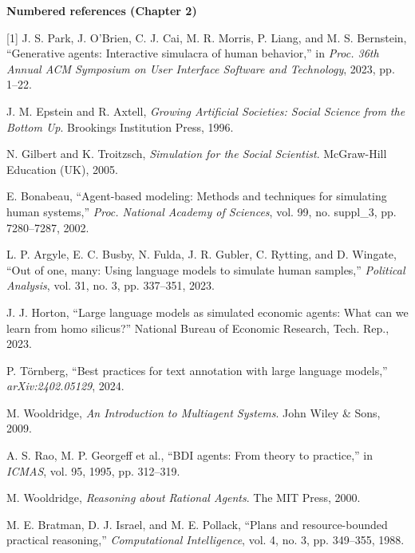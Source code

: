 
{\footnotesize\setlength{\parindent}{0pt}

\textbf{Numbered references (Chapter 2)}\par\smallskip

[1] J. S. Park, J. O'Brien, C. J. Cai, M. R. Morris, P. Liang, and M. S. Bernstein, ``Generative agents: Interactive simulacra of human behavior,'' in \textit{Proc. 36th Annual ACM Symposium on User Interface Software and Technology}, 2023, pp. 1--22.\par\smallskip
[2] J. M. Epstein and R. Axtell, \textit{Growing Artificial Societies: Social Science from the Bottom Up}. Brookings Institution Press, 1996.\par\smallskip
[3] N. Gilbert and K. Troitzsch, \textit{Simulation for the Social Scientist}. McGraw-Hill Education (UK), 2005.\par\smallskip
[4] E. Bonabeau, ``Agent-based modeling: Methods and techniques for simulating human systems,'' \textit{Proc. National Academy of Sciences}, vol. 99, no. suppl\_3, pp. 7280--7287, 2002.\par\smallskip
[5] L. P. Argyle, E. C. Busby, N. Fulda, J. R. Gubler, C. Rytting, and D. Wingate, ``Out of one, many: Using language models to simulate human samples,'' \textit{Political Analysis}, vol. 31, no. 3, pp. 337--351, 2023.\par\smallskip
[6] J. J. Horton, ``Large language models as simulated economic agents: What can we learn from homo silicus?'' National Bureau of Economic Research, Tech. Rep., 2023.\par\smallskip
[7] P. Törnberg, ``Best practices for text annotation with large language models,'' \textit{arXiv:2402.05129}, 2024.\par\smallskip
[8] M. Wooldridge, \textit{An Introduction to Multiagent Systems}. John Wiley \& Sons, 2009.\par\smallskip
[9] A. S. Rao, M. P. Georgeff et al., ``BDI agents: From theory to practice,'' in \textit{ICMAS}, vol. 95, 1995, pp. 312--319.\par\smallskip
[10] M. Wooldridge, \textit{Reasoning about Rational Agents}. The MIT Press, 2000.\par\smallskip
[11] M. E. Bratman, D. J. Israel, and M. E. Pollack, ``Plans and resource-bounded practical reasoning,'' \textit{Computational Intelligence}, vol. 4, no. 3, pp. 349--355, 1988.\par\smallskip
}
